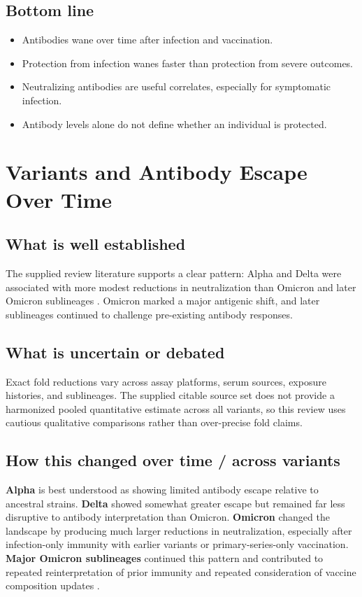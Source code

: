 \documentclass[12pt]{article}
\begin{document}
\subsection*{Bottom line}
\begin{itemize}[leftmargin=1.5em]
    \item Antibodies wane over time after infection and vaccination.
    \item Protection from infection wanes faster than protection from severe outcomes.
    \item Neutralizing antibodies are useful correlates, especially for symptomatic infection.
    \item Antibody levels alone do not define whether an individual is protected.
\end{itemize}

\section{Variants and Antibody Escape Over Time}
\subsection*{What is well established}
The supplied review literature supports a clear pattern: Alpha and Delta were associated with more modest reductions in neutralization than Omicron and later Omicron sublineages \cite{ref3,ref5}. Omicron marked a major antigenic shift, and later sublineages continued to challenge pre-existing antibody responses.

\subsection*{What is uncertain or debated}
Exact fold reductions vary across assay platforms, serum sources, exposure histories, and sublineages. The supplied citable source set does not provide a harmonized pooled quantitative estimate across all variants, so this review uses cautious qualitative comparisons rather than over-precise fold claims.

\subsection*{How this changed over time / across variants}
\textbf{Alpha} is best understood as showing limited antibody escape relative to ancestral strains.  
\textbf{Delta} showed somewhat greater escape but remained far less disruptive to antibody interpretation than Omicron.  
\textbf{Omicron} changed the landscape by producing much larger reductions in neutralization, especially after infection-only immunity with earlier variants or primary-series-only vaccination.  
\textbf{Major Omicron sublineages} continued this pattern and contributed to repeated reinterpretation of prior immunity and repeated consideration of vaccine composition updates \cite{ref9,ref10}.
\end{document}
